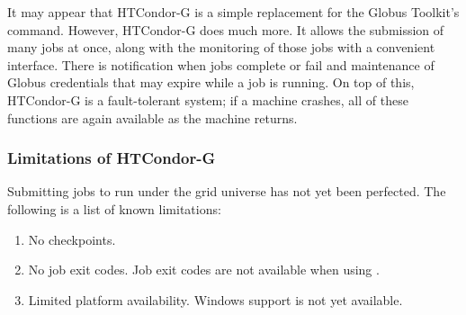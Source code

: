 
It may appear that HTCondor-G is a simple replacement
for the Globus Toolkit's  command.
However, HTCondor-G does much more.
It allows the submission of many jobs at once,
along with the monitoring of those jobs with a convenient interface.
There is notification when jobs complete or fail
and maintenance of Globus credentials
that may expire while a job is running.
On top of this, HTCondor-G is a fault-tolerant system;
if a machine crashes,
all of these functions are again available as the machine returns.










\subsubsection{\label{sec:HTCondor-G-Limits}Limitations of HTCondor-G}
Submitting jobs to run under the grid universe has not yet
been perfected.
The following is a list of known limitations:

\begin{enumerate}
\item{No checkpoints.}
\item{No job exit codes.}
Job exit codes are not available when using
.
\item{Limited platform availability.}
Windows support is not yet available.
\end{enumerate}



